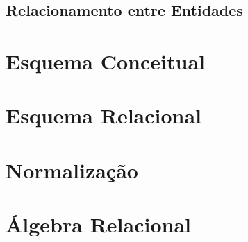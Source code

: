 \documentclass[12pt, onecolumn, titlepage]{article}
\begin{document}
\subsection{Relacionamento entre Entidades}
\label{sect:relacionamento}

\section{Esquema Conceitual}
\label{sect:conceitual}


\section{Esquema Relacional}
\label{sect:relacional}


\section{Normalização}
\label{sect:normalizacao}


\section{Álgebra Relacional}
\label{sect:algebra}
\end{document}
